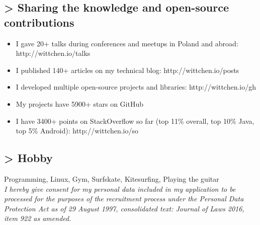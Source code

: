 \documentclass[8pt]{extarticle}
\begin{document}
    \subsection*{\normalsize{> Sharing the knowledge and open-source contributions}}
    \begin{itemize}
      \item I gave 20+ talks during conferences and meetups in Poland and abroad: http://wittchen.io/talks
      \item I published 140+ articles on my technical blog: http://wittchen.io/posts
      \item I developed multiple open-source projects and libraries: http://wittchen.io/gh
      \item My projects have 5900+ stars on GitHub
      \item I have 3400+ points on StackOverflow so far (top 11\% overall, top 10\% Java, top 5\% Android): http://wittchen.io/so
    \end{itemize}

    \subsection*{\normalsize{> Hobby}}
    Programming, Linux, Gym, Surfskate, Kitesurfing, Playing the guitar\\

    \textit{
    I hereby give consent for my personal data included in my application
    to be processed for the purposes of the recruitment process
    under the Personal Data Protection Act as of 29 August 1997,
    consolidated text: Journal of Laws 2016, item 922 as amended.
    }
\end{document}
